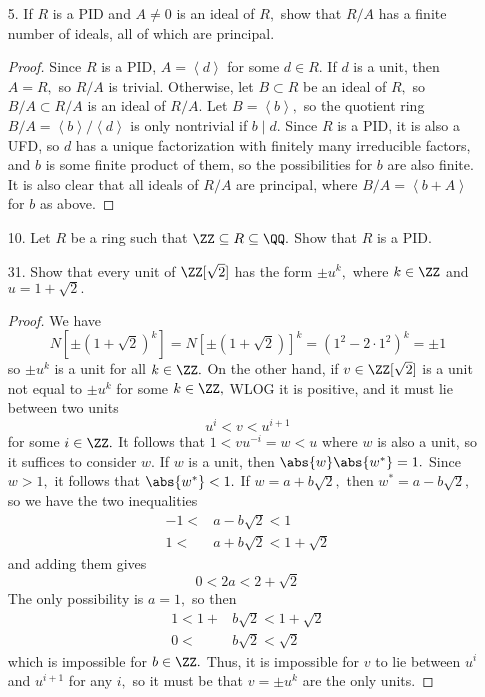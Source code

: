\documentclass{article}
\begin{document}
\begin{itemize}
	\item[5.] If $R$ is a PID and $A\neq 0$ is an ideal of $R,$ show that $R/A$ has a finite number of ideals, all of which are principal.
		\begin{proof}
			Since $R$ is a PID, $A=\left< d\right>$ for some $d\in R.$ If $d$ is a unit, then $A=R,$ so $R/A$ is trivial. Otherwise, let $B\subset R$ be an ideal of $R,$ so $B/A\subset R/A$ is an ideal of $R/A.$ Let $B=\left< b\right>,$ so the quotient ring $B/A=\left< b\right>/\left< d\right>$ is only nontrivial if $b\mid d.$ Since $R$ is a PID, it is also a UFD, so $d$ has a unique factorization with finitely many irreducible factors, and $b$ is some finite product of them, so the possibilities for $b$ are also finite. It is also clear that all ideals of $R/A$ are principal, where $B/A=\left< b+A\right>$ for $b$ as above.
		\end{proof}

	\item[10.] Let $R$ be a ring such that $\ZZ\subseteq R\subseteq \QQ.$ Show that $R$ is a PID.

	\item[31.] Show that every unit of $\ZZ[\sqrt{2}]$ has the form $\pm u^k,$ where $k\in\ZZ$ and $u=1+\sqrt{2}.$
		\begin{proof}
			We have 
			\[N\left[ \pm(1+\sqrt{2})^k \right] = N\left[ \pm(1+\sqrt{2}) \right]^k = (1^2-2\cdot1^2)^k = \pm 1\]
			so $\pm u^k$ is a unit for all $k\in\ZZ.$ On the other hand, if $v\in\ZZ[\sqrt{2}]$ is a unit not equal to $\pm u^k$ for some $k\in \ZZ,$ WLOG it is positive, and it must lie between two units
			\[u^i<v<u^{i+1}\]
			for some $i\in\ZZ.$ It follows that $1<vu^{-i}=w<u$ where $w$ is also a unit, so it suffices to consider $w.$ If $w$ is a unit, then $\abs{w}\abs{w^*}=1.$ Since $w>1,$ it follows that $\abs{w^*}<1.$ If $w=a+b\sqrt{2},$ then $w^*=a-b\sqrt{2},$ so we have the two inequalities
			\begin{align*}
				-1 < &a-b\sqrt{2} < 1 \\
				1 < &a+b\sqrt{2} < 1+\sqrt{2}
			\end{align*}
			and adding them gives
			\[0 < 2a < 2+\sqrt{2}\]
			The only possibility is $a=1,$ so then
			\begin{align*}
				1 < 1+&b\sqrt{2} < 1+\sqrt{2} \\
				0 < &b\sqrt{2} < \sqrt{2}
			\end{align*}
			which is impossible for $b\in\ZZ.$ Thus, it is impossible for $v$ to lie between $u^i$ and $u^{i+1}$ for any $i,$ so it must be that $v=\pm u^k$ are the only units.
		\end{proof}
		
\end{itemize}
\end{document}
